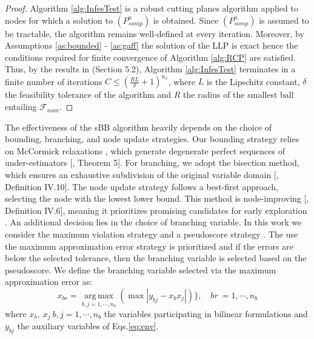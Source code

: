 \documentclass[sn-mathphys-num]{sn-jnl}
\DeclareMathOperator*{\argmax}{arg\,max}
\begin{document}
\begin{proof}
Algorithm \ref{alg:InfesTest} is a robust cutting planes algorithm  applied to nodes for which a solution to $(P_{samp}^n)$ is obtained. Since $(P_{samp}^n)$ is assumed to be tractable, the algorithm remains well-defined at every iteration. Moreover, by Assumptions \ref{as:bounded} - \ref{as:gaff} the solution of the LLP is exact hence the conditions required for finite convergence of Algorithm \ref{alg:RCP} are satisfied. Thus, by the results in \citet{Mutapcic2009} (Section 5.2), Algorithm \ref{alg:InfesTest} terminates in a finite number of iterations $C\leq (\frac{RL}{\delta}+1)^{n_x} $, where $L$ is the Lipschitz constant, $\delta$ the feasibility tolerance of the algorithm and $R$ the radius of the smallest ball entailing $\mathcal{F}_{nom}$.
\end{proof}
The effectiveness of the sBB algorithm heavily depends on the choice of bounding, branching, and node update strategies. Our bounding strategy relies on McCormick relaxations \citep{Mitsos2009,Bompadre2012}, which generate degenerate perfect sequences of under-estimators [\citet{Scott2011}, Theorem 5]. For branching, we adopt the bisection method, which ensures an exhaustive subdivision of the original variable domain [\citet{Horst1996}, Definition IV.10]. The node update strategy follows a best-first approach, selecting the node with the lowest lower bound. This method is node-improving [\citet{Horst1996}, Definition IV.6], meaning it prioritizes promising candidates for early exploration \citep{Locatelli2013}. An additional decision lies in the choice of branching variable. In this work we consider the maximum violation strategy \citep{Smith1999,Tawarmalani2004, Belotti2009} and a pseudoscore strategy \citep{Achterberg2005,Belotti2009}. The use the maximum approximation error strategy is prioritized and if the errors are below the selected tolerance, then the branching variable is selected based on the pseudoscore. We define the branching variable selected via the maximum approximation error as: 
\begin{equation}
    x_{br}=\underset{b,j =1,\cdots,n_{b}}{\argmax}(\max|y_{bj}-x_bx_j|)\}, \quad br\ =1,\cdots,n_{b}
\end{equation}
where $x_b,~x_j ~b,j =1,\cdots,n_{b}$ the variables participating in bilinear formulations and $y_{bj}$ the auxiliary variables of Eqs.\ref{eq:env}.
\end{document}
